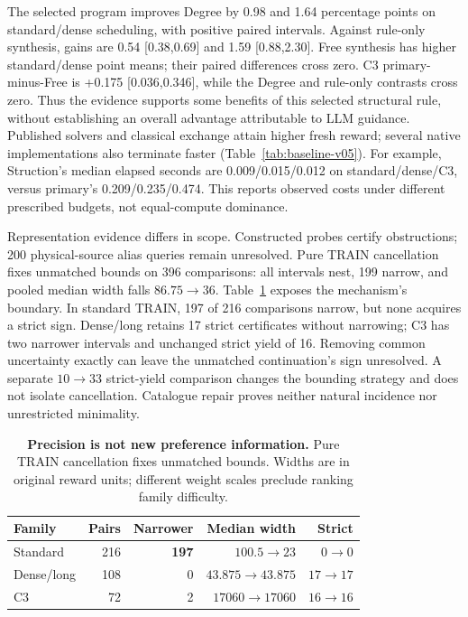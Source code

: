 The selected program improves Degree by 0.98 and 1.64 percentage points on
standard/dense scheduling, with positive paired intervals. Against rule-only
synthesis, gains are 0.54 [0.38,0.69] and 1.59 [0.88,2.30]. Free synthesis
has higher standard/dense point means; their paired differences cross zero.
C3 primary-minus-Free is +0.175 [0.036,0.346], while the Degree and rule-only
contrasts cross zero. Thus the evidence supports some benefits of this selected
structural rule, without establishing an overall advantage attributable to LLM
guidance. Published solvers and classical exchange attain higher fresh reward;
several native implementations also terminate faster (Table~\ref{tab:baseline-v05}).
For example, Struction's median elapsed seconds are 0.009/0.015/0.012
on standard/dense/C3, versus primary's 0.209/0.235/0.474. This reports
observed costs under different prescribed budgets, not equal-compute dominance.

Representation evidence differs in scope. Constructed probes certify
obstructions; 200 physical-source alias queries remain unresolved.
Pure TRAIN cancellation fixes unmatched bounds on 396 comparisons: all
intervals nest, 199 narrow, and pooled median width falls $86.75\to36$.
Table~\ref{tab:cancellation-strata} exposes the mechanism's boundary.
In standard TRAIN, 197 of 216 comparisons narrow, but none acquires a strict
sign. Dense/long retains 17 strict certificates without narrowing; C3 has
two narrower intervals and unchanged strict yield of 16. Removing common
uncertainty exactly can leave the unmatched continuation's sign unresolved.
A separate $10\to33$ strict-yield comparison changes the bounding strategy
and does not isolate cancellation. Catalogue repair proves neither natural
incidence nor unrestricted minimality.

\begin{table}[t]
\centering
\caption{\textbf{Precision is not new preference information.} Pure TRAIN
cancellation fixes unmatched bounds. Widths are in original reward units;
different weight scales preclude ranking family difficulty.}
\label{tab:cancellation-strata}
\setlength{\tabcolsep}{3pt}
\begin{tabular}{lrrrr}
\toprule
Family & Pairs & Narrower & Median width & Strict \\
\midrule
\rowcolor{blue!7} Standard & 216 & \textbf{197} & $100.5\to23$ & $0\to0$ \\
Dense/long & 108 & 0 & $43.875\to43.875$ & $17\to17$ \\
C3 & 72 & 2 & $17060\to17060$ & $16\to16$ \\
\bottomrule
\end{tabular}
\end{table}


